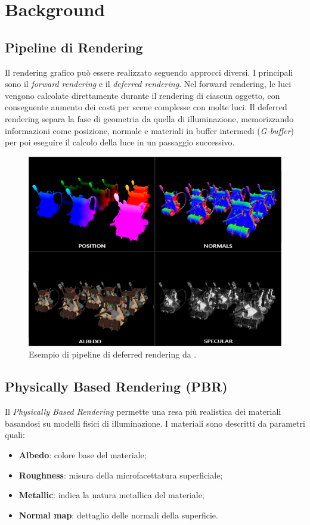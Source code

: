 \documentclass[12pt,a4paper,openright,twoside]{book}
\begin{document}
\chapter{Background}
\label{chap:background}

\section{Pipeline di Rendering}
Il rendering grafico può essere realizzato seguendo approcci diversi. I principali sono il \emph{forward rendering}
e il \emph{deferred rendering}.
Nel forward rendering, le luci vengono calcolate direttamente durante il rendering di ciascun oggetto, con conseguente
aumento dei costi per scene complesse con molte luci.
Il deferred rendering separa la fase di geometria da quella di illuminazione, memorizzando informazioni come posizione,
normale e materiali in buffer intermedi (\emph{G-buffer}) per poi eseguire il calcolo della luce in un passaggio successivo.
\begin{figure}[h!]
    \centering
    \includegraphics[width=.8\linewidth]{figures/g_buffer_example.png}
    \caption{Esempio di pipeline di deferred rendering da \cite{learnopengl}.}
    \label{fig:deferred-pipeline}
\end{figure}

\section{Physically Based Rendering (PBR)}
Il \emph{Physically Based Rendering} permette una resa più realistica dei materiali basandosi su modelli fisici
di illuminazione.
I materiali sono descritti da parametri quali:
\begin{itemize}
    \item \textbf{Albedo}: colore base del materiale;
    \item \textbf{Roughness}: misura della microfacettatura superficiale;
    \item \textbf{Metallic}: indica la natura metallica del materiale;
    \item \textbf{Normal map}: dettaglio delle normali della superficie.
\end{itemize}
\end{document}
